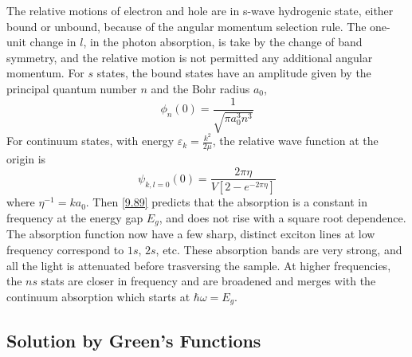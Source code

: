 The relative motions of electron and hole are in s-wave hydrogenic state, either bound or unbound, because of the angular momentum selection rule.
The one-unit change in $l$, in the photon absorption, is take by the change of band symmetry, and the relative motion is not permitted any additional angular momentum.
For $s$ states, the bound states have an amplitude given by the principal quantum number $n$ and the Bohr radius $a_0$,
\begin{equation}
    \phi_n(0) = \frac{1}{\sqrt{\pi a_0^3 n^3}} \label{9.89}
\end{equation}
For continuum states, with energy $\varepsilon_k = \frac{k^2}{2\mu} $, the relative wave function at the origin is
\begin{equation}
    \psi_{k,l=0}(0) = \frac{2\pi \eta}{V \left[2- e^{-2\pi \eta} \right]}
\end{equation}
where $\eta^{-1} = k a_0$.
Then \eqref{9.89} predicts that the absorption is a constant in frequency at the energy gap $E_g$, and does not rise with a square root dependence.
The absorption function now have a few sharp, distinct exciton lines at low frequency correspond to $1s$, $2s$, etc.
These absorption bands are very strong, and all the light is attenuated before trasversing the sample.
At higher frequencies, the $ns$ stats are closer in frequency and are broadened and merges with the continuum absorption which starts at $\hbar \omega = E_g$.

\subsection{Solution by Green's Functions}

